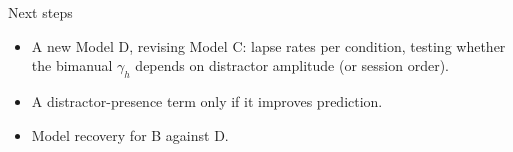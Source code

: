 \begin{frame}{Next steps}
  \begin{itemize}
    \item A new Model D, revising Model C: lapse rates per condition, testing whether the bimanual
          $\gamma_h$ depends on distractor amplitude (or session order).
    \item A distractor-presence term only if it improves prediction.
    \item Model recovery for B against D.
  \end{itemize}
\end{frame}
